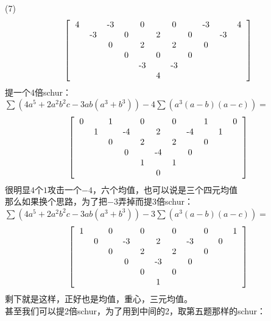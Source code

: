 \documentclass[UTF8]{ctexart}
\begin{document}
(7)\renewcommand*{\arraystretch}{1.732}\[\left[\begin{matrix}
	\begin{tabular}{ccccccccccccc}
		4& &-3& &0& &0& &-3& &4\\
		&-3& &0& &2& &0& &-3&\\
		& &0& &2& &2& &0& &\\
		& & &0& &0& &0& & &\\
		& & & &-3& &-3& & & &\\
		& & & & &4& & & & &\\
	\end{tabular}
\end{matrix}\right]\]
提一个4倍schur：$ \displaystyle \sum (4a^{5}+2a^{2}b^{2}c-3ab(a^{3}+b^{3}))-4\displaystyle \sum (a^{3}(a-b)(a-c))= $
\renewcommand*{\arraystretch}{1.732}\[\left[\begin{matrix}
	\begin{tabular}{ccccccccccccc}
		0& &1& &0& &0& &1& &0\\
		&1& &-4& &2& &-4& &1&\\
		& &0& &2& &2& &0& &\\
		& & &0& &-4& &0& & &\\
		& & & &1& &1& & & &\\
		& & & & &0& & & & &\\
	\end{tabular}
\end{matrix}\right]\]
很明显$ 4 $个$ 1 $攻击一个$ -4 $，六个均值，也可以说是三个四元均值\\
那么如果换个思路，为了把$ -3 $弄掉而提$ 3 $倍schur：\\
$ \displaystyle \sum (4a^{5}+2a^{2}b^{2}c-3ab(a^{3}+b^{3}))-3\displaystyle \sum (a^{3}(a-b)(a-c))= $
\renewcommand*{\arraystretch}{1.732}\[\left[\begin{matrix}
	\begin{tabular}{ccccccccccccc}
		1& &0& &0& &0& &0& &1\\
		&0& &-3& &2& &-3& &0&\\
		& &0& &2& &2& &0& &\\
		& & &0& &-3& &0& & &\\
		& & & &0& &0& & & &\\
		& & & & &1& & & & &\\
	\end{tabular}
\end{matrix}\right]\]
剩下就是这样，正好也是均值，重心，三元均值。\\
甚至我们可以提2倍schur，为了用到中间的2，取第五题那样的schur：\\
\end{document}

